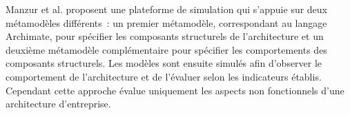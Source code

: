 Manzur et al. \cite{manzur2015xarchimate} proposent une plateforme de simulation qui s'appuie sur deux métamodèles différents~: un premier métamodèle, correspondant au
langage Archimate, pour spécifier les composants structurels de l'architecture
et un deuxième métamodèle complémentaire pour spécifier les comportements des
composants structurels. Les modèles sont ensuite simulés afin d'observer le
comportement de l'architecture et de l'évaluer selon les indicateurs établis.
Cependant cette approche évalue uniquement les aspects non fonctionnels d'une
architecture d'entreprise.

